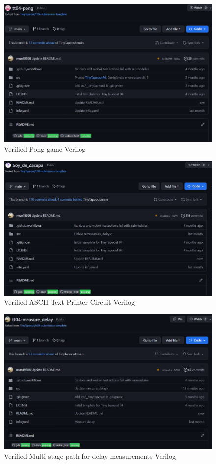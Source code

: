 \begin{figure}[H]
    \centering
    \includegraphics[width=\linewidth]{Pictures/pong.png}
    \caption{Verified Pong game Verilog}\label{fig:enter-label2}
\end{figure}

\begin{figure}[H]
    \centering
    \includegraphics[width=\linewidth]{Pictures/verifide_zacapa.png}
    \caption{Verified ASCII Text Printer Circuit Verilog}\label{fig:enter-label3}
\end{figure}

\begin{figure}[H]
    \centering
    \includegraphics[width=\linewidth]{Pictures/delay ver.png}
    \caption{Verified Multi stage path for delay measurements Verilog}
    \label{fig:enter-label4}
\end{figure}

